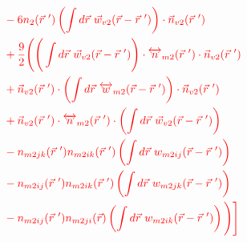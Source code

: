 \documentclass[double,12pt]{revtex4-2}
\begin{document}
\begin{align}
     &\color{red}-6n_2(\vec r~')\left(\int d\vec r ~\vec 
     w_{v2}(\vec r-\vec r~')\right)\cdot \vec n_{v2}(\vec r~')\nonumber \\
     &\color{red}+\frac{9}{2}\Bigg(\Bigg(\int d\vec r ~\vec w_{v2}(\vec r-\vec r~')
     \Bigg)
     \cdot \overleftrightarrow n_{m2}(\vec r~')\cdot \vec n_{v2}(\vec r~') 
     \nonumber\\
     &\color{red}+\vec n_{v2}(\vec r~')\cdot \left(\int d\vec r ~\overleftrightarrow 
     w_{m2}(\vec r-\vec r~')\right) \cdot \vec n_{v2}( \vec r~') \nonumber\\    
     &\color{red}+\vec n_{v2}( \vec r~')\cdot \overleftrightarrow n_{m2}(\vec r~')
     \cdot \left(\int d\vec r ~\vec w_{v2}(\vec r-\vec r~')\right)
     \nonumber\\
     &\color{red}-n_{m2jk}(\vec r~')n_{m2ik}(\vec r~')\left(\int d\vec r~w_{m2ij}
     (\vec r-\vec r~')\right) \nonumber \\
     &\color{red}-n_{m2ij}(\vec r~')n_{m2ik}(\vec r~')\left(\int d\vec r~w_{m2jk}
     (\vec r-\vec r~')\right)\nonumber \\
     &\color{red}-n_{m2ij}(\vec r~')n_{m2ji}(\vec r)\left(\int d\vec r~w_{m2ik}
     (\vec r-\vec r~')\right)     
     \Bigg)\Bigg] 
\end{align} 
\end{document}
